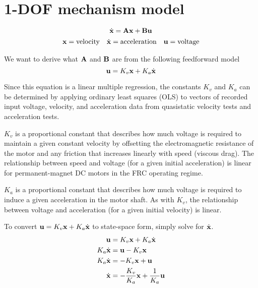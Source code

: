 \section{1-DOF mechanism model}
\begin{equation*}
  \dot{\mathbf{x}} = \mathbf{A}\mathbf{x} + \mathbf{B}\mathbf{u}
\end{equation*}
\begin{equation*}
  \begin{array}{ccc}
    \mathbf{x} = \text{velocity} & \dot{\mathbf{x}} = \text{acceleration} &
      \mathbf{u} = \text{voltage}
  \end{array}
\end{equation*}

We want to derive what $\mathbf{A}$ and $\mathbf{B}$ are from the following
feedforward model
\begin{equation*}
  \mathbf{u} = K_v \mathbf{x} + K_a \dot{\mathbf{x}}
\end{equation*}

Since this equation is a linear multiple regression, the constants $K_v$ and
$K_a$ can be determined by applying ordinary least squares (OLS) to vectors of
recorded input voltage, velocity, and acceleration data from quasistatic
velocity tests and acceleration tests.

$K_v$ is a proportional constant that describes how much voltage is required to
maintain a given constant velocity by offsetting the electromagnetic resistance
of the motor and any friction that increases linearly with speed (viscous drag).
The relationship between speed and voltage (for a given initial acceleration) is
linear for permanent-magnet DC motors in the FRC operating regime.

$K_a$ is a proportional constant that describes how much voltage is required to
induce a given acceleration in the motor shaft. As with $K_v$, the relationship
between voltage and acceleration (for a given initial velocity) is linear.

To convert $\mathbf{u} = K_v \mathbf{x} + K_a \dot{\mathbf{x}}$ to state-space form,
simply solve for $\dot{\mathbf{x}}$.
\begin{align*}
  \mathbf{u} &= K_v \mathbf{x} + K_a \dot{\mathbf{x}} \\
  K_a \dot{\mathbf{x}} &= \mathbf{u} - K_v \mathbf{x} \\
  K_a \dot{\mathbf{x}} &= -K_v \mathbf{x} + \mathbf{u} \\
  \dot{\mathbf{x}} &= -\frac{K_v}{K_a} \mathbf{x} + \frac{1}{K_a} \mathbf{u}
\end{align*}

